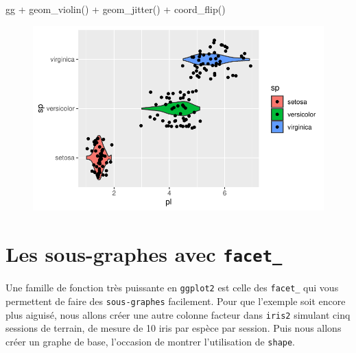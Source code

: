 \documentclass[
  letterpaper,
  DIV=11,
  numbers=noendperiod]{scrreprt}
\newenvironment{Shaded}{\begin{snugshade}}{\end{snugshade}}
\newcommand{\FunctionTok}[1]{\textcolor[rgb]{0.28,0.35,0.67}{#1}}
\newcommand{\NormalTok}[1]{\textcolor[rgb]{0.00,0.23,0.31}{#1}}
\newcommand{\SpecialCharTok}[1]{\textcolor[rgb]{0.37,0.37,0.37}{#1}}
\begin{document}
\begin{Shaded}
\begin{Highlighting}[]
\NormalTok{gg }\SpecialCharTok{+} \FunctionTok{geom\_violin}\NormalTok{() }\SpecialCharTok{+} \FunctionTok{geom\_jitter}\NormalTok{() }\SpecialCharTok{+} \FunctionTok{coord\_flip}\NormalTok{()}
\end{Highlighting}
\end{Shaded}

\begin{figure}[H]

{\centering \includegraphics{ggplot2_files/figure-pdf/unnamed-chunk-25-2.pdf}

}

\end{figure}

\hypertarget{les-sous-graphes-avec-facet_}{%
\section{\texorpdfstring{Les sous-graphes avec
\texttt{facet\_}}{Les sous-graphes avec facet\_}}\label{les-sous-graphes-avec-facet_}}

Une famille de fonction très puissante en \texttt{ggplot2} est celle des
\texttt{facet\_} qui vous permettent de faire des \texttt{sous-graphes}
facilement. Pour que l'exemple soit encore plus aiguisé, nous allons
créer une autre colonne facteur dans \texttt{iris2} simulant cinq
sessions de terrain, de mesure de 10 iris par espèce par session. Puis
nous allons créer un graphe de base, l'occasion de montrer l'utilisation
de \texttt{shape}.
\end{document}
